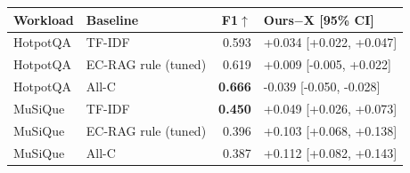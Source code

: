 \begin{tabular}{@{}llrl@{}}
\toprule
Workload & Baseline & F1$\uparrow$ & Ours$-$X [95\% CI]\\
\midrule
HotpotQA & TF-IDF & 0.593 & +0.034 [+0.022, +0.047]\\
HotpotQA & EC-RAG rule (tuned) & 0.619 & +0.009 [-0.005, +0.022]\\
HotpotQA & All-C & \textbf{0.666} & -0.039 [-0.050, -0.028]\\
MuSiQue & TF-IDF & \textbf{0.450} & +0.049 [+0.026, +0.073]\\
MuSiQue & EC-RAG rule (tuned) & 0.396 & +0.103 [+0.068, +0.138]\\
MuSiQue & All-C & 0.387 & +0.112 [+0.082, +0.143]\\
\bottomrule
\end{tabular}
